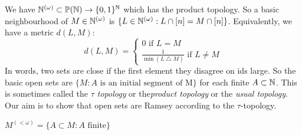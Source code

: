 \documentclass[a4paper]{article}
\newcommand{\Nomega}{\N^{(\omega)}}
\newcommand{\Mfinite}{M^{(< \omega)}}
\begin{document}
  We have $\Nomega \subset \P(\N) \to \{0,1\}^{\N}$ which has the product
  topology. So a basic neighbourhood of $M \in \Nomega$ is $\{L \in \Nomega : L
  \cap [n] = M \cap [n]\}$. Equivalently, we have a metric $d(L,M)$:
  \[d(L,M) =
    \begin{cases}
      0 \text{ if } L = M \\
      \frac{1}{\min{(L \bigtriangleup M)}} \text{ if } L \neq M
      \end{cases}
    \]
  In words, two sets are close if the first element they disagree on ids large.  
  So the basic open sets are $\{M : A \text{ is an initial segment of M}\}$ for
  each finite $A \subset \mathbb{N}$. This is sometimes called the \textit{$\tau$
    topology} or the\textit{product
    topology} or the \textit{usual topology}. Our aim is to show that open sets are Ramsey according to the
  $\tau$-topology.
  \begin{defi}[$\Mfinite$]
$\Mfinite = \{A \subset M : A \text{ finite}\}$
\end{defi}
    
  \printindex
\end{document}
